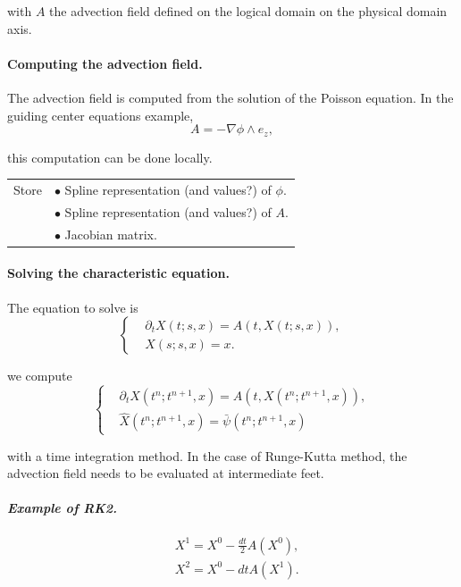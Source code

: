 \documentclass[presentation.tex]{subfiles}
\begin{document}
with $A$ the advection field defined on the logical domain on the physical domain axis. 


\paragraph{Computing the advection field.}
The advection field is computed from the solution of the Poisson equation. In the guiding center equations example,
\begin{equation}
	A = - \nabla \phi \wedge e_z,
\end{equation}

this computation can be done locally. 


\begin{center}
\begin{tabular}{ |l|l| } 
 \hline
 Store 	& $\bullet$ Spline representation (and values?) of $\phi$. \\
 		& $\bullet$ Spline representation (and values?) of $A$. \\
  		& $\bullet$ Jacobian matrix. \\
 \hline
\end{tabular}
\end{center}


\paragraph{Solving the characteristic equation. }
The equation to solve is 
\begin{equation}
\left\{
\begin{aligned}
	& \partial_t X(t; s, x)  = A(t,X(t; s, x)), \\
	& X(s; s, x) = x.
\end{aligned}
\right.
\end{equation}


we compute 
\begin{equation}
\left\{
\begin{aligned}
	& \partial_t X(t^{n}; t^{n+1}, x)  = A(t, X(t^{n}; t^{n+1}, x)), \\
	& \hat{X}(t^{n}; t^{n+1}, x) = \bar{\psi} (t^{n}; t^{n+1}, x)
\end{aligned}
\right.
\end{equation}

with a time integration method. In the case of Runge-Kutta method, the advection field needs to be evaluated at intermediate feet.

\paragraph{\textit{Example of RK2.}}
\begin{equation}
\begin{aligned}
	& X^1 = X^0 - \frac{dt}{2} A(X^0), \\
	& X^2 = X^0 - dt A(X^1). \\
\end{aligned}
\end{equation}
\end{document}
